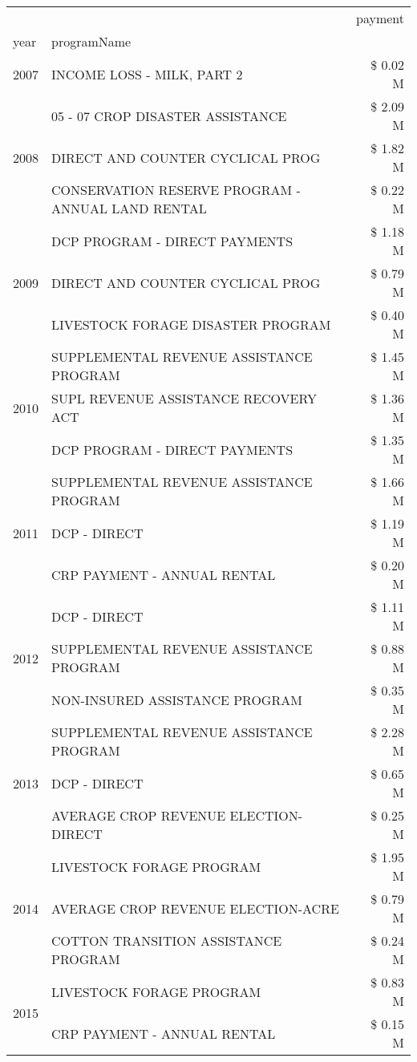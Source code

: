 \begin{tabular}{llr}
\toprule
 &  & payment \\
year & programName &  \\
\midrule
2007 & INCOME LOSS - MILK, PART 2 & \$ 0.02 M \\
\cline{1-3}
\multirow[t]{3}{*}{2008} & 05 - 07 CROP DISASTER ASSISTANCE & \$ 2.09 M \\
 & DIRECT AND COUNTER CYCLICAL PROG & \$ 1.82 M \\
 & CONSERVATION RESERVE PROGRAM - ANNUAL LAND RENTAL & \$ 0.22 M \\
\cline{1-3}
\multirow[t]{3}{*}{2009} & DCP PROGRAM - DIRECT PAYMENTS & \$ 1.18 M \\
 & DIRECT AND COUNTER CYCLICAL PROG & \$ 0.79 M \\
 & LIVESTOCK FORAGE DISASTER  PROGRAM & \$ 0.40 M \\
\cline{1-3}
\multirow[t]{3}{*}{2010} & SUPPLEMENTAL REVENUE ASSISTANCE PROGRAM & \$ 1.45 M \\
 & SUPL REVENUE ASSISTANCE RECOVERY ACT & \$ 1.36 M \\
 & DCP PROGRAM - DIRECT PAYMENTS & \$ 1.35 M \\
\cline{1-3}
\multirow[t]{3}{*}{2011} & SUPPLEMENTAL REVENUE ASSISTANCE PROGRAM & \$ 1.66 M \\
 & DCP - DIRECT & \$ 1.19 M \\
 & CRP PAYMENT - ANNUAL RENTAL & \$ 0.20 M \\
\cline{1-3}
\multirow[t]{3}{*}{2012} & DCP - DIRECT & \$ 1.11 M \\
 & SUPPLEMENTAL REVENUE ASSISTANCE PROGRAM & \$ 0.88 M \\
 & NON-INSURED ASSISTANCE PROGRAM & \$ 0.35 M \\
\cline{1-3}
\multirow[t]{3}{*}{2013} & SUPPLEMENTAL REVENUE ASSISTANCE PROGRAM & \$ 2.28 M \\
 & DCP - DIRECT & \$ 0.65 M \\
 & AVERAGE CROP REVENUE ELECTION-DIRECT & \$ 0.25 M \\
\cline{1-3}
\multirow[t]{3}{*}{2014} & LIVESTOCK FORAGE PROGRAM & \$ 1.95 M \\
 & AVERAGE CROP REVENUE ELECTION-ACRE & \$ 0.79 M \\
 & COTTON TRANSITION ASSISTANCE PROGRAM & \$ 0.24 M \\
\cline{1-3}
\multirow[t]{3}{*}{2015} & LIVESTOCK FORAGE PROGRAM & \$ 0.83 M \\
 & CRP PAYMENT - ANNUAL RENTAL & \$ 0.15 M \\

\end{tabular}

